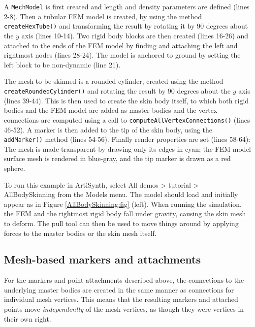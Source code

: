 A {\tt MechModel} is first created and length and density parameters
are defined (lines 2-8). Then a tubular FEM model is created, by using
the  method {\tt
createHexTube()} and transforming the result by rotating it by 90
degrees about the $y$ axis (lines 10-14). Two rigid body blocks are
then created (lines 16-26) and attached to the ends of the FEM model
by finding and attaching the left and rightmost nodes (lines 28-24).
The model is anchored to ground by setting the left block to be
non-dynamic (line 21).

The mesh to be skinned is a rounded cylinder, created using the
 method {\tt
createRoundedCylinder()} and rotating the result by 90 degrees about
the $y$ axis (lines 39-44). This is then used to create the skin body
itself, to which both rigid bodies and the FEM model are added as
master bodies and the vertex connections are computed using a call to
{\tt computeAllVertexConnections()} (lines 46-52). A marker is then
added to the tip of the skin body, using the {\tt addMarker()} method
(lines 54-56). Finally render properties are set (lines 58-64):
The mesh is made transparent by drawing only its edges in cyan; the
FEM model surface mesh is rendered in blue-gray, and the
tip marker is drawn as a red sphere.

To run this example in ArtiSynth, select {\sf All demos > tutorial >
AllBodySkinning} from the {\sf Models} menu. The model should load and
initially appear as in Figure \ref{AllBodySkinning:fig} (left). When
running the simulation, the FEM and the rightmost rigid body fall
under gravity, causing the skin mesh to deform. The pull tool
can then be used to move things around by applying forces to the
master bodies or the skin mesh itself.

\subsection{Mesh-based markers and attachments}

For the markers and point attachments described above, the connections
to the underlying master bodies are created in the same manner as
connections for individual mesh vertices. This means that the
resulting markers and attached points move {\it independently} of the
mesh vertices, as though they were vertices in their own right.

